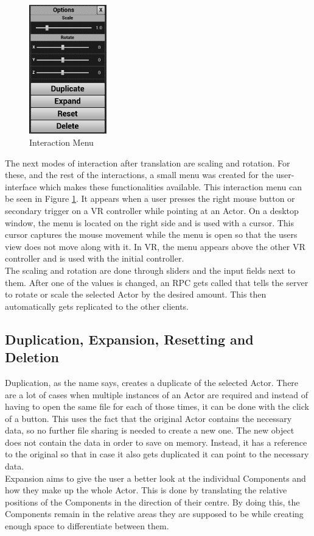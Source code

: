 \begin{figure}
	\centering
	\includegraphics[width=0.30\textwidth]{fig/InteractionMenu2.png}
	\caption[Interaction Menu instead of UI Editor]{Interaction Menu}
	\label{fig:InteractionMenu}
\end{figure}

The next modes of interaction after translation are scaling and rotation. For these, and the rest of the interactions, a small menu was created for the user-interface which makes these functionalities available. This interaction menu can be seen in Figure \ref{fig:InteractionMenu}. It appears when a user presses the right mouse button or secondary trigger on a \acs{VR} controller while pointing at an Actor. On a desktop window, the menu is located on the right side and is used with a cursor. This cursor captures the mouse movement while the menu is open so that the users view does not move along with it. In \acs{VR}, the menu appears above the other VR controller and is used with the initial controller.\\
The scaling and rotation are done through sliders and the input fields next to them. After one of the values is changed, an \acs{RPC} gets called that tells the server to rotate or scale the selected Actor by the desired amount. This then automatically gets replicated to the other clients.

\subsection{Duplication, Expansion, Resetting and Deletion}

Duplication, as the name says, creates a duplicate of the selected Actor. There are a lot of cases when multiple instances of an Actor are required and instead of having to open the same file for each of those times, it can be done with the click of a button. This uses the fact that the original Actor contains the necessary data, so no further file sharing is needed to create a new one. The new object does not contain the data in order to save on memory. Instead, it has a reference to the original so that in case it also gets duplicated it can point to the necessary data.\\
Expansion aims to give the user a better look at the individual Components and how they make up the whole Actor. This is done by translating the relative positions of the Components in the direction of their centre. By doing this, the Components remain in the relative areas they are supposed to be while creating enough space to differentiate between them.


